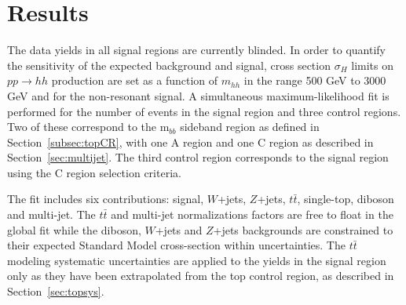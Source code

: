 \section{Results}
\label{sec:dihiggs_result}

The data yields in all signal regions are currently blinded. In order to quantify the sensitivity of the expected background and signal, cross section $\sigma_{H}$ limits on $pp \to hh$ production are set as a function of  $m_{hh}$ in the range 500 GeV to 3000 GeV and for the non-resonant signal. A simultaneous maximum-likelihood fit is performed for the number of events in the signal region and three control regions. Two of these correspond to the $\text{m}_{bb}$ sideband region as defined in Section~\ref{subsec:topCR}, with one A region and one C region as described in Section~\ref{sec:multijet}. The third control region corresponds to the signal region using the C region selection criteria.

The fit includes six contributions: signal, $W$+jets, $Z$+jets, $t\bar{t}$, single-top, diboson and multi-jet. The $t\bar{t}$ and multi-jet normalizations factors are free to float in the global fit while the diboson, $W$+jets and $Z$+jets backgrounds are constrained to their expected Standard Model cross-section within uncertainties. The $t\bar{t}$ modeling systematic uncertainties are applied to the yields in the signal region only as they have been extrapolated from the top control region, as described in Section~\ref{sec:topsys}.

